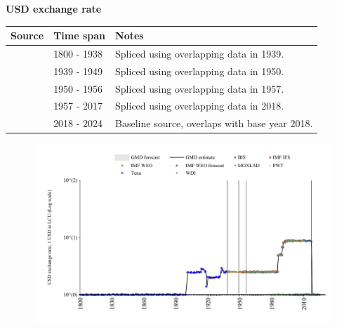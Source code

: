 \documentclass[12pt,a4paper,landscape]{article}
\begin{document}
\begin{adjustbox}{max totalsize={\paperwidth}{\paperheight},center}
\begin{minipage}[t][\textheight][t]{\textwidth}
\vspace*{0.5cm}
{}
\begin{center}
{\Large\bfseries USD exchange rate}
\end{center}
\vspace{0.5cm}
\begin{table}[H]
\centering
\small
\begin{tabular}{|l|l|l|}
\hline
\textbf{Source} & \textbf{Time span} & \textbf{Notes} \\
\hline
\rowcolor{white}\cite{Tena}& 1800 - 1938 &Spliced using overlapping data in 1939. \\
\rowcolor{lightgray}\cite{MOXLAD}& 1939 - 1949 &Spliced using overlapping data in 1950. \\
\rowcolor{white}\cite{IMF_IFS}& 1950 - 1956 &Spliced using overlapping data in 1957. \\
\rowcolor{lightgray}\cite{BIS}& 1957 - 2017 &Spliced using overlapping data in 2018. \\
\rowcolor{white}\cite{IMF_IFS}& 2018 - 2024 &Baseline source, overlaps with base year 2018. \\
\hline
\end{tabular}
\end{table}
\begin{figure}[H]
\centering
\includegraphics[width=\textwidth,height=0.6\textheight,keepaspectratio]{graphs/SLV_USDfx.pdf}
\end{figure}
\end{minipage}
\end{adjustbox}
\end{document}
